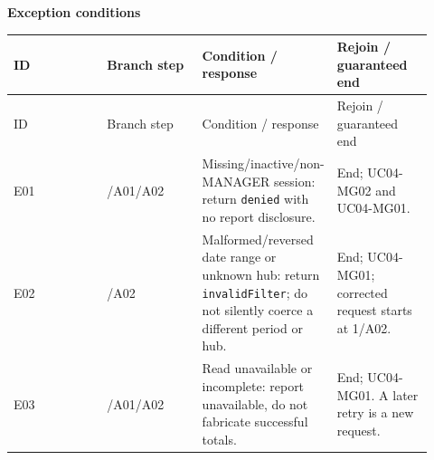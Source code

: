 \textbf{Exception conditions}

\begin{longtable}{>{\raggedright\arraybackslash}p{0.2300\linewidth}>{\raggedright\arraybackslash}p{0.2300\linewidth}>{\raggedright\arraybackslash}p{0.2300\linewidth}>{\raggedright\arraybackslash}p{0.2300\linewidth}}
ID & Branch step & Condition / response & Rejoin / guaranteed end \\
\hline\endfirsthead
ID & Branch step & Condition / response & Rejoin / guaranteed end \\
\hline\endhead
E01 & 2/A01/A02 & Missing/inactive/non-MANAGER session: return \texttt{denied} with no report disclosure. & End; UC04-MG02 and UC04-MG01. \\
E02 & 2/A02 & Malformed/reversed date range or unknown hub: return \texttt{invalidFilter}; do not silently coerce a different period or hub. & End; UC04-MG01; corrected request starts at 1/A02. \\
E03 & 3/A01/A02 & Read unavailable or incomplete: report unavailable, do not fabricate successful totals. & End; UC04-MG01. A later retry is a new request. \\
\end{longtable}
